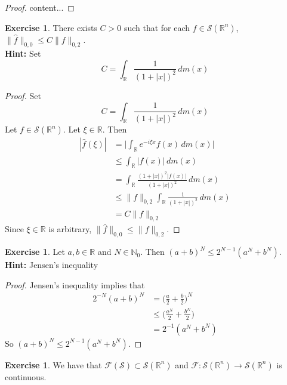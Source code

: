 \documentclass[12pt]{amsart}
\theoremstyle{definition}
\newtheorem{ex}[definition]{Exercise}
\newcommand{\N}{\mathbb{N}}
\newcommand{\R}{\mathbb{R}}
\newcommand{\MF}{\mathcal{F}}
\newcommand{\MS}{\mathcal{S}}
\newcommand{\dm}{\, d m}
\begin{document}
	\begin{proof}
		content...
	\end{proof}

	\begin{ex}
		There exists $C >0$ such that for each $f \in \MS(\R^n)$, $\|\hat{f}\|_{0,0} \leq C \|f\|_{0, 2}$.\\
		\textbf{Hint:} Set $$C = \int_{\R} \frac{1}{(1+|x|)^2} \dm(x)$$
	\end{ex}
	
	\begin{proof}
		Set 
		$$C = \int_{\R} \frac{1}{(1+|x|)^2} \dm(x)$$
		Let $f \in \MS(\R^n)$. Let $\xi \in \R$. Then 
		\begin{align*}
			|\hat{f}(\xi)| 
			& = \bigg| \int_{\R} e^{-i\xi x} f(x) \dm(x) \bigg| \\
			& \leq  \int_{\R} | f(x)| \dm(x) \\
			& =  \int_{\R} \frac{(1+|x|)^2|f(x)|}{(1+|x|)^2} \dm(x) \\
			& \leq \|f\|_{0, 2} \int_{\R} \frac{1}{(1+|x|)^2} \dm(x) \\
			& = C\|f\|_{0, 2}
		\end{align*}
		Since $\xi \in \R$ is arbitrary, $\|\hat{f}\|_{0,0} \leq \|f\|_{0, 2}$.
	\end{proof}

	\begin{ex}
		Let $a, b \in \R$ and $N \in \N_0$. Then $(a + b)^N \leq 2^{N-1} (a^N + b^N)$. \\
		\textbf{Hint:} Jensen's inequality
	\end{ex}
	
	\begin{proof}
		Jensen's inequality implies that 
		\begin{align*}
			2^{-N}(a + b)^N 
			& = \bigg(\frac{a}{2} + \frac{b}{2} \bigg)^N \\
			& \leq \bigg(\frac{a^N}{2} + \frac{b^N}{2} \bigg) \\
			& = 2^{-1}(a^N + b^N)
		\end{align*}
	So $(a + b)^N \leq 2^{N-1} (a^N + b^N)$.
	\end{proof}

	\begin{ex}
		We have that $ \MF(\MS) \subset \MS(\R^n)$ and $\MF: \MS(\R^n) \rightarrow \MS(\R^n)$ is continuous. 
	\end{ex}
\end{document}
